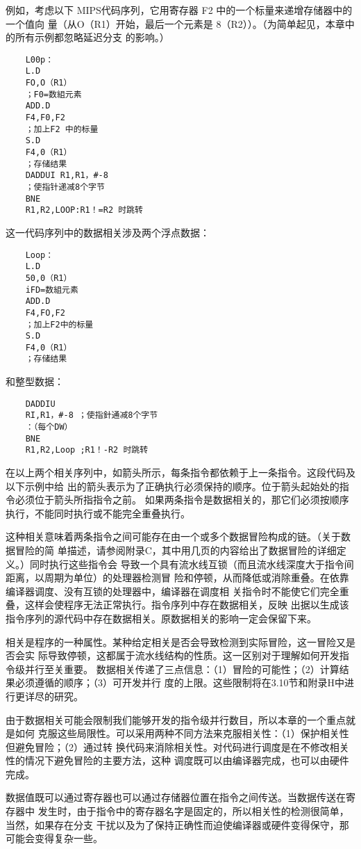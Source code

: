 例如，考虑以下 MIPS代码序列，它用寄存器 F2 中的一个标量来递增存储器中的一个值向
量（从O（R1）开始，最后一个元素是 8（R2））。（为简单起见，本章中的所有示例都忽略延迟分支
的影响。）
\begin{verbatim}
    L00p：
    L.D
    FO,O（R1）
    ；F0=数組元素
    ADD.D
    F4,F0,F2
    ；加上F2 中的标量
    S.D
    F4,0（R1）
    ；存储结果
    DADDUI R1,R1，#-8
    ；使指针递减8个字节
    BNE
    R1,R2,LOOP:R1！=R2 时跳转
\end{verbatim}
    这一代码序列中的数据相关涉及两个浮点数据：
\begin{verbatim}
    Loop：
    L.D
    50,0（R1）
    iFD=数組元素
    ADD.D
    F4,FO,F2
    ；加上F2中的标量
    S.D
    F4,0（R1）
    ；存储结果
\end{verbatim}
    和整型数据：
\begin{verbatim}
    DADDIU
    RI,R1，#-8 ；使指針通减8个字节
    ：（每个DW）
    BNE
    R1,R2,Loop ;R1！-R2 时跳转
\end{verbatim}
在以上两个相关序列中，如箭头所示，每条指令都依赖于上一条指令。这段代码及以下示例中给
出的箭头表示为了正确执行必须保持的顺序。位于箭头起始处的指令必须位于箭头所指指令之前。
如果两条指令是数据相关的，那它们必须按顺序执行，不能同时执行或不能完全重叠执行。

这种相关意味着两条指令之间可能存在由一个或多个数据冒险构成的链。（关于数据冒险的简
单描述，请参阅附录C，其中用几页的内容给出了数据冒险的详细定义。）同时执行这些指令会
导致一个具有流水线互锁（而且流水线深度大于指令间距离，以周期为单位）的处理器检测冒
险和停顿，从而降低或消除重叠。在依靠编译器调度、没有互锁的处理器中，编译器在调度相
关指令时不能使它们完全重叠，这样会使程序无法正常执行。指令序列中存在数据相关，反映
出据以生成该指令序列的源代码中存在数据相关。原数据相关的影响一定会保留下来。

相关是程序的一种属性。某种给定相关是否会导致检测到实际冒险，这一冒险又是否会实
际导致停顿，这都属于流水线结构的性质。这一区别对于理解如何开发指令级并行至关重要。
数据相关传递了三点信息：（1）冒险的可能性；（2）计算结果必须遵循的顺序；（3）可开发并行
度的上限。这些限制将在3.10节和附录H中进行更详尽的研究。

由于数据相关可能会限制我们能够开发的指令级并行数目，所以本章的一个重点就是如何
克服这些局限性。可以采用两种不同方法来克服相关性：（1）保护相关性但避免冒险；（2）通过转
换代码来消除相关性。对代码进行调度是在不修改相关性的情况下避免冒险的主要方法，这种
调度既可以由编译器完成，也可以由硬件完成。

数据值既可以通过寄存器也可以通过存储器位置在指令之间传送。当数据传送在寄存器中
发生时，由于指令中的寄存器名字是固定的，所以相关性的检测很简单，当然，如果存在分支
干扰以及为了保持正确性而迫使编译器或硬件变得保守，那可能会变得复杂一些。

